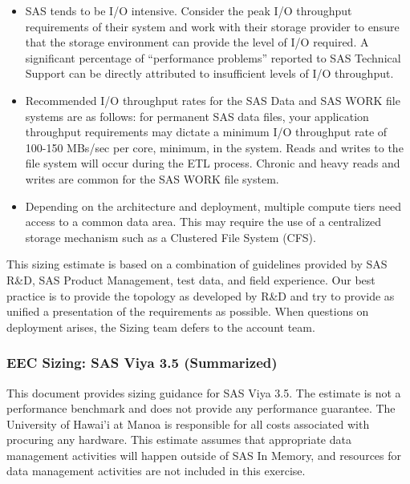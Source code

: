 \begin{enumerate}
    \begin{itemize}
        \item SAS tends to be I/O intensive. Consider the peak I/O throughput requirements of their system and work with their storage provider to ensure that the storage environment can provide the level of I/O required. A significant percentage of “performance problems” reported to SAS Technical Support can be directly attributed to insufficient levels of I/O throughput.
        \item Recommended I/O throughput rates for the SAS Data and SAS WORK file systems are as follows: for permanent SAS data files, your application throughput requirements may dictate a minimum I/O throughput rate of 100-150 MBs/sec per core, minimum, in the system. Reads and writes to the file system will occur during the ETL process. Chronic and heavy reads and writes are common for the SAS WORK file system. 
        \item Depending on the architecture and deployment, multiple compute tiers need access to a common data area. This may require the use of a centralized storage mechanism such as a Clustered File System (CFS).
    \end{itemize}
\end{enumerate}

This sizing estimate is based on a combination of guidelines provided by SAS R\&D, SAS Product Management, test data, and field experience. Our best practice is to provide the topology as developed by R\&D and try to provide as unified a presentation of the requirements as possible. When questions on deployment arises, the Sizing team defers to the account team.

\subsubsection{EEC Sizing: SAS Viya 3.5 (Summarized)}

This document provides sizing guidance for SAS Viya 3.5. The estimate is not a performance benchmark and does not provide any performance guarantee. The University of Hawai’i at Manoa is responsible for all costs associated with procuring any hardware. This estimate assumes that appropriate data management activities will happen outside of SAS In Memory, and resources for data management activities are not included in this exercise.

